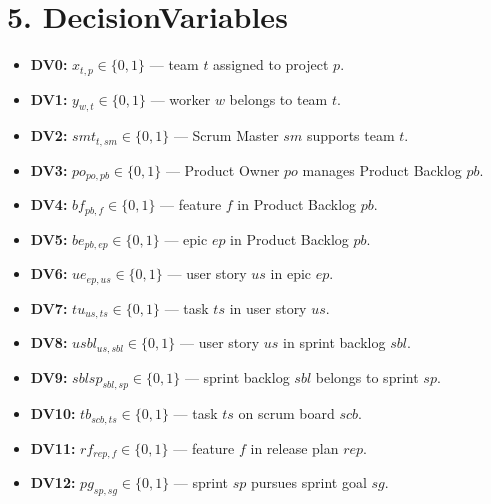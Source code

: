 \documentclass[11pt]{article}
\begin{document}
\section{5. DecisionVariables}
\begin{itemize}[leftmargin=*,itemsep=4pt]
  \item \textbf{DV0:} $x_{t,p}\in\{0,1\}$ --- team $t$ assigned to project $p$.
  \item \textbf{DV1:} $y_{w,t}\in\{0,1\}$ --- worker $w$ belongs to team $t$.
  \item \textbf{DV2:} $smt_{t,sm}\in\{0,1\}$ --- Scrum Master $sm$ supports team $t$.
  \item \textbf{DV3:} $po_{po,pb}\in\{0,1\}$ --- Product Owner $po$ manages Product Backlog $pb$.
  \item \textbf{DV4:} $bf_{pb,f}\in\{0,1\}$ --- feature $f$ in Product Backlog $pb$.
  \item \textbf{DV5:} $be_{pb,ep}\in\{0,1\}$ --- epic $ep$ in Product Backlog $pb$.
  \item \textbf{DV6:} $ue_{ep,us}\in\{0,1\}$ --- user story $us$ in epic $ep$.
  \item \textbf{DV7:} $tu_{us,ts}\in\{0,1\}$ --- task $ts$ in user story $us$.
  \item \textbf{DV8:} $usbl_{us,sbl}\in\{0,1\}$ --- user story $us$ in sprint backlog $sbl$.
  \item \textbf{DV9:} $sblsp_{sbl,sp}\in\{0,1\}$ --- sprint backlog $sbl$ belongs to sprint $sp$.
  \item \textbf{DV10:} $tb_{scb,ts}\in\{0,1\}$ --- task $ts$ on scrum board $scb$.
  \item \textbf{DV11:} $rf_{rep,f}\in\{0,1\}$ --- feature $f$ in release plan $rep$.
  \item \textbf{DV12:} $pg_{sp,sg}\in\{0,1\}$ --- sprint $sp$ pursues sprint goal $sg$.
\end{itemize}
\end{document}
